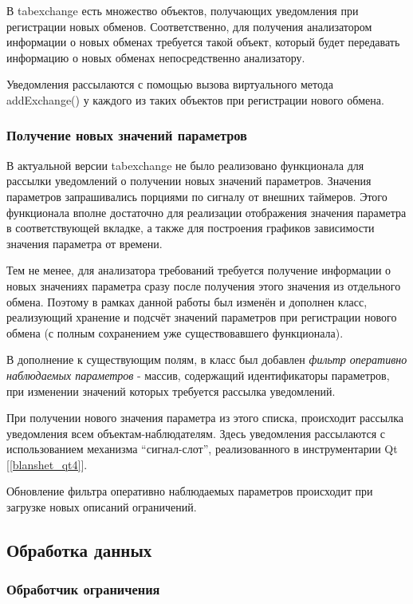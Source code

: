 В tabexchange есть множество объектов, получающих уведомления при 
регистрации новых обменов. Соответственно, для получения анализатором 
информации о новых обменах требуется такой объект, который будет 
передавать информацию о новых обменах непосредственно анализатору.

Уведомления рассылаются с помощью вызова виртуального метода addExchange() у 
каждого из таких объектов при регистрации нового обмена.

\subsubsection{Получение новых значений параметров}

В актуальной версии tabexchange не было реализовано функционала для рассылки 
уведомлений о получении новых значений параметров. Значения параметров 
запрашивались порциями по сигналу от внешних таймеров. Этого функционала вполне 
достаточно для реализации отображения значения параметра в соответствующей 
вкладке, а также для построения графиков зависимости значения параметра от 
времени. 

Тем не менее, для анализатора требований требуется получение 
информации о новых значениях параметра сразу после получения этого значения из 
отдельного обмена. Поэтому в рамках данной работы был изменён и 
дополнен класс, реализующий хранение и подсчёт значений параметров при 
регистрации нового обмена (с полным сохранением уже существовавшего 
функционала).

В дополнение к существующим полям, в класс был добавлен \textit{фильтр 
оперативно наблюдаемых параметров} - массив, содержащий идентификаторы 
параметров, при изменении значений которых требуется рассылка уведомлений.

При получении нового значения параметра из этого списка, происходит рассылка 
уведомления всем объектам-наблюдателям. Здесь уведомления рассылаются 
с использованием механизма ``сигнал-слот'', реализованного в инструментарии Qt 
[\ref{blanshet_qt4}].

Обновление фильтра оперативно наблюдаемых параметров происходит при загрузке 
новых описаний ограничений.


\subsection{Обработка данных}

\subsubsection{Обработчик ограничения}

